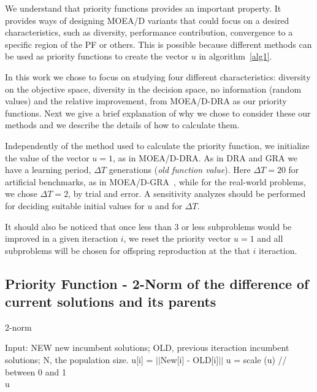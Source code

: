 
We understand that priority functions provides an important property. It provides ways of designing MOEA/D variants that could focus on a desired characteristics, such as diversity, performance contribution, convergence to a specific region of the PF or others. This is possible because different methods can be used as priority functions to create the vector $u$ in algorithm~\ref{alg1}. 

In this work we chose to focus on studying four different characteristics: diversity on the objective space, diversity in the decision space, no information (random values) and the relative improvement, from MOEA/D-DRA as our priority functions. Next we give a brief explanation of why we chose to consider these  our methods and we describe the details of how to calculate them.

Independently of the method used to calculate the priority function, we initialize the value of the vector $u=1$, as in MOEA/D-DRA. As in DRA and GRA we have a learning period, $\Delta T$ generations (\textit{old function value}). Here $\Delta T=20$ for artificial benchmarks, as in MOEA/D-GRA~\cite{zhou2016all}, while for the real-world problems, we chose $\Delta T=2$, by trial and error. A sensitivity analyzes should be performed for deciding suitable initial values for $u$ and for $\Delta T$.

 It should also be noticed that once less than $3$ or less subproblems would be improved in a given iteraction $i$, we reset the priority vector $u = 1$  and all subproblems will be chosen for offspring reproduction at the that $i$ iteraction.

\subsection{Priority Function - 2-Norm of the difference of current solutions and its parents} 

\begin{algorithm}[t]
	\caption{2-norm}\label{alg3}
	\begin{algorithmic}[1]
		
		\State Input: NEW new incumbent solutions; OLD, previous iteraction incumbent solutions; N, the population size.
			\State u[i] = $||$New[i] - OLD[i]$||$
		\EndFor
		\State u = scale (u) // between 0 and 1\\
	\Return u
	\end{algorithmic}
\end{algorithm}

